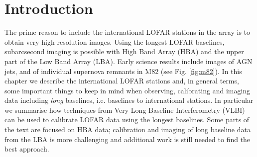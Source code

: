 \documentclass[graybox]{svmult}
\begin{document}

\section{Introduction}
\label{sec:introduction}

The prime reason to include the international LOFAR stations in the array is to
obtain very high-resolution images.  Using the longest LOFAR baselines,
subarcsecond imaging is possible with High Band Array (HBA) and the upper part
of the Low Band Array (LBA). Early science results include images of AGN jets,
and of individual supernova remnants in M82 (see Fig. \ref{fig:m82}). In this chapter we describe the
international LOFAR stations and, in general terms, some important things to
keep in mind when observing, calibrating and imaging data including \emph{long}
baselines, i.e.  baselines to international stations.  In particular we
summarise how techniques from Very Long Baseline Interferometry (VLBI) can be
used to calibrate LOFAR data using the longest baselines. Some parts of the text are
focused on HBA data; calibration and imaging of long baseline data from the LBA
is more challenging and additional work is still needed to find the best
approach. 
\end{document}
